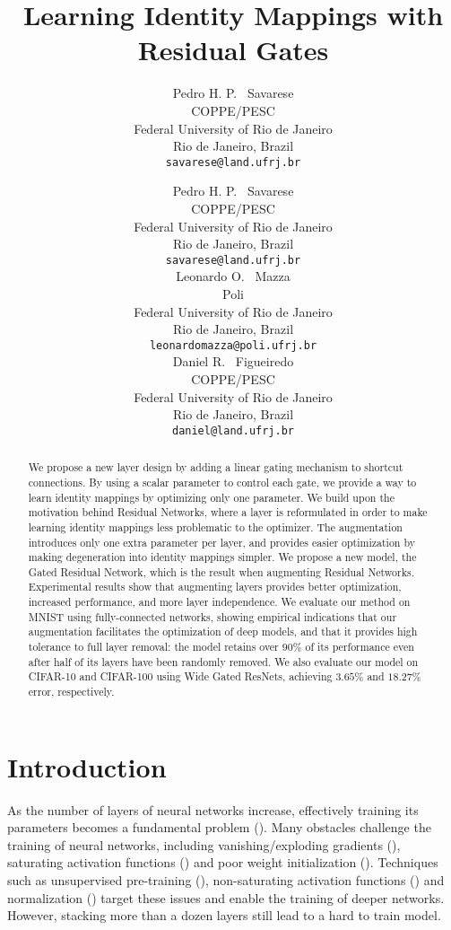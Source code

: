 \documentclass{article} \RequirePackage{amsmath,amsthm,amsfonts,amssymb}
\title{Learning Identity Mappings with Residual Gates}
\author{Pedro H. P. ~Savarese\\
COPPE/PESC\\
Federal University of Rio de Janeiro\\
Rio de Janeiro, Brazil \\
\texttt{savarese@land.ufrj.br} \\
}
\author{Pedro H. P. ~Savarese \\
COPPE/PESC\\
Federal University of Rio de Janeiro\\
Rio de Janeiro, Brazil  \\
\texttt{savarese@land.ufrj.br} \\
\And
Leonardo O. ~Mazza \\
Poli \\
Federal University of Rio de Janeiro \\
Rio de Janeiro, Brazil \\
\texttt{leonardomazza@poli.ufrj.br} \\
\And
Daniel R. ~Figueiredo \\
COPPE/PESC \\
Federal University of Rio de Janeiro \\
Rio de Janeiro, Brazil \\
\texttt{daniel@land.ufrj.br} \\
}
\begin{document}
\maketitle

\begin{abstract}


We propose a new layer design by adding a linear gating mechanism to shortcut connections. By using a scalar parameter to control each gate, we provide a way to learn identity mappings by optimizing only one parameter. We build upon the motivation behind Residual Networks, where a layer is reformulated in order to make learning identity mappings less problematic to the optimizer. The augmentation introduces only one extra parameter per layer, and provides easier optimization by making degeneration into identity mappings simpler. We propose a new model, the Gated Residual Network, which is the result when augmenting Residual Networks. Experimental results show that augmenting layers provides better optimization, increased performance, and more layer independence. We evaluate our method on MNIST using fully-connected networks, showing empirical indications that our augmentation facilitates the optimization of deep models, and that it provides high tolerance to full layer removal: the model retains over $90 \%$ of its performance even after half of its layers have been randomly removed. We also evaluate our model on CIFAR-10 and CIFAR-100 using Wide Gated ResNets, achieving $3.65 \%$ and $18.27 \%$ error, respectively.


\end{abstract}












\section{Introduction}
\label{introduction}



As the number of layers of neural networks increase, effectively training its parameters becomes a fundamental problem (\cite{deephard}). Many obstacles challenge the training of neural networks, including vanishing/exploding gradients (\cite{hardtrain}), saturating activation functions (\cite{saturation}) and poor weight initialization (\cite{glorot}). Techniques such as unsupervised pre-training (\cite{aes}), non-saturating activation functions (\cite{relu}) and normalization (\cite{bn}) target these issues and enable the training of deeper networks. However, stacking more than a dozen layers still lead to a hard to train model. 
\end{document}
